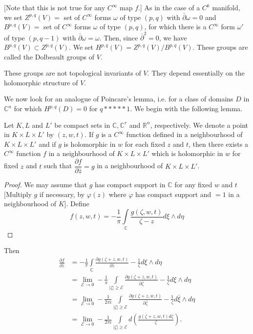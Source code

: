 [Note that this is not true for any $C^\infty$ map $f$.] As in the
case of a $C^k$ manifold, we set $Z^{p,q}(V) = $ set of $C^\infty$
forms $\omega$ of type $(p,q)$ with $\bar{\partial} \omega = 0$ and
$B^{p,q}(V) = $ set of $C^\infty$ forms $\omega$ of type $(p,q)$, for
which there is a $C^\infty$ form $\omega'$ of type $(p,q - 1)$ with
$\bar{\partial} \omega = \omega$. Then, since $\bar{\partial}^2 = 0$,
we have $B^{p,q}(V) \subset Z^{p,q}(V)$. We set $H^{p,q}(V) =
Z^{p,q}(V) / B^{p,q}(V)$. These groups are called the Dolbeault groups
of $V$. 

These groups are not topological invariants of $V$. They depend
essentially on the holomorphic structure of $V$. 

We now look for an analogue of Poincare's lemma, i.e. for a class of
domains $D$ in $\mathbb{C}^n$  for which $H^{p,q}(D) = 0$ for $q*****1$. We begin
with the following lemma. 

\begin{lemma*}%
  Let $K, L$ and $L'$ be compact sets in $\mathbb{C}, \mathbb{C}^r$
  and $\mathbb{R}^n$, respectively. We denote a point in $K \times L
  \times L'$ by $(z, w, t)$. If $g$ is a $C^\infty$ function defined
  in a neighbourhood of $K \times L \times L'$ and if $g$ is
  holomorphic in $w$ for each fixed $z$ and $t$, then there exists a
  $C^\infty$ function $f$ in a neighbourhood of $K \times L \times L'$
  which is holomorphic in $w$ for fixed $z$ and $t$ such that
  $\dfrac{\partial f}{\partial \bar{z}} = g$ in a neighbourhood of $K \times
  L \times L'$. 
\end{lemma*}

\begin{proof}
  We may assume that $g$ has compact support in $\mathbb{C}$ for any
  fixed $w$ and $t$ [Multiply $g$ if necessary, by $\varphi(z)$ where
    $\varphi$ has compact support and $= 1$ in a neighbourhood of
    $K$]. 
    Define 
  $$
  f(z, w, t) = - \frac{1}{\pi} \int\limits_{\mathbb{C}} \frac{g
    (\zeta, w,t)}{\zeta - z} d \xi \wedge d \eta 
  $$
\end{proof}

Then\pageoriginale 
\begin{align*}
  \frac{\partial f} {\partial \bar{z}} & = - \frac{1}{\pi}
  \int\limits_{\mathbb{C}} \frac{\partial g (\zeta + z, w, t)} {\partial
    \bar{z }} - \frac{1}{\zeta} d \xi \wedge d \eta \\ 
  & = \lim\limits_{\mathcal{E} \to 0}- \frac{1}{\pi} \int\limits_{|
    \zeta | \geq \mathcal{E}} \frac{\partial g (\zeta + z, w, t)}
             {\partial \bar{\zeta }} - \frac{1}{\zeta} d \xi \wedge d
             \eta \\ 
  & = \lim\limits_{\mathcal{E} \to 0}- \frac{1}{2 \pi i }
             \int\limits_{| \zeta | \geq \mathcal{E}} \frac{\partial g
               (\zeta + z, w, t)} {\partial \bar{\zeta }} -
             \frac{1}{\zeta} d \bar{\xi} \wedge d \eta \\ 
  & = \lim\limits_{\mathcal{E} \to 0}- \frac{1}{2 \pi i }
             \int\limits_{| \zeta | \geq \mathcal{E}} d\left(\frac{g
               (\zeta + z, w, t) d \zeta}{\zeta}\right). 
\end{align*}

